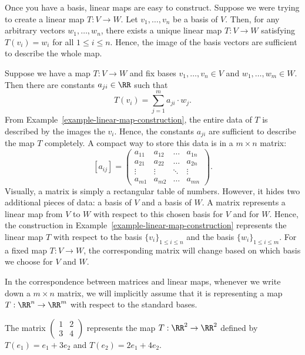 \documentclass[11pt]{article}
\begin{document}
\begin{example} \label{example-linear-map-construction}
    Once you have a basis, linear maps are easy to construct. Suppose we were trying to create a linear map $T : V \to W$. Let $v_1, \ldots, v_n$ be a basis of $V$. Then, for any arbitrary vectors $w_1, \ldots, w_n$, there exists a unique linear map $T : V \to W$ satisfying $T(v_i) = w_i$ for all $1 \leq i \leq n$. Hence, the image of the basis vectors are sufficient to describe the whole map. 
\end{example}


Suppose we have a map $T : V \to W$ and fix bases $v_1, \ldots, v_n \in V$ and $w_1, \ldots, w_m \in W$. Then there are constants $a_{ji} \in \RR$ such that 
\[
    T(v_i) = \sum_{j = 1}^m a_{ji} \cdot w_j.
\]
From Example~\ref{example-linear-map-construction}, the entire data of $T$ is described by the images the $v_i$. Hence, the constants $a_{ji}$ are sufficient to describe the map $T$ completely. A compact way to store this data is in a $m \times n$ matrix: 
\[
    [a_{ij}] = \begin{pmatrix}
        a_{11} & a_{12} & \ldots & a_{1n} \\
        a_{21} & a_{22} & \ldots & a_{2n} \\
        \vdots & \vdots & \ddots & \vdots \\
        a_{m1} & a_{m2} & \hdots & a_{mn}
    \end{pmatrix}.
\]
Visually, a matrix is simply a rectangular table of numbers. However, it hides two additional pieces of data: a basis of $V$ and a basis of $W$. A matrix represents a linear map from $V$ to $W$ with respect to this chosen basis for $V$ and for $W$. Hence, the construction in Example~\ref{example-linear-map-construction} represents the linear map $T$ with respect to the basis $\{v_i\}_{1 \leq i \leq n}$ and the basis $\{w_i\}_{1 \leq i \leq m}$. For a fixed map $T : V \to W$, the corresponding matrix will change based on which basis we choose for $V$ and $W$. 
\begin{remark} 
    In the correspondence between matrices and linear maps, whenever we write down a $m \times n$ matrix, we will implicitly assume that it is representing a map $T : \RR^n \to \RR^m$ with respect to the standard bases. 
\end{remark}
\begin{example}
    The matrix $\begin{pmatrix} 1 & 2 \\ 3 & 4 \end{pmatrix}$ represents the map $T : \RR^2 \to \RR^2$ defined by $T(e_1) = e_1 + 3e_2$ and $T(e_2) = 2e_1 + 4e_2$. 
\end{example}
\end{document}
